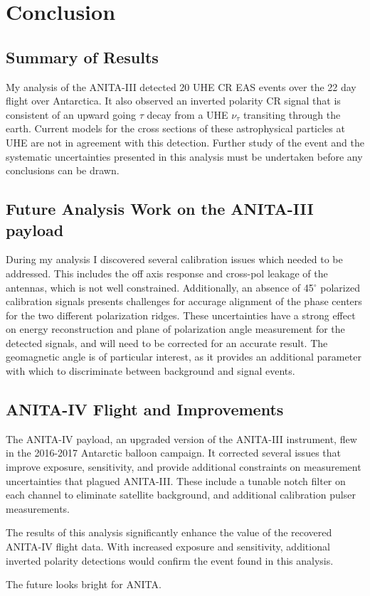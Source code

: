 			
\chapter{Conclusion}

\section{Summary of Results}
	My analysis of the ANITA-III detected 20 UHE CR EAS events over the 22 day flight over Antarctica.  It also observed an inverted polarity CR signal that is consistent of an upward going $\tau$ decay from a UHE $\nu_{\tau}$ transiting through the earth.  Current models for the cross sections of these astrophysical particles at UHE are not in agreement with this detection.  Further study of the event and the systematic uncertainties presented in this analysis must be undertaken before any conclusions can be drawn.


\section{Future Analysis Work on the ANITA-III payload}
	During my analysis I discovered several calibration issues which needed to be addressed.  This includes the off axis response and cross-pol leakage of the antennas, which is not well constrained.  Additionally, an absence of 45$^\circ$ polarized calibration signals presents challenges for accurage alignment of the phase centers for the two different polarization ridges.  These uncertainties have a strong effect on energy reconstruction and plane of polarization angle measurement for the detected signals, and will need to be corrected for an accurate result.  The geomagnetic angle is of particular interest, as it provides an additional parameter with which to discriminate between background and signal events.


\section{ANITA-IV Flight and Improvements}
	The ANITA-IV payload, an upgraded version of the ANITA-III instrument, flew in the 2016-2017 Antarctic balloon campaign.  It corrected several issues that improve exposure, sensitivity, and provide additional constraints on measurement uncertainties that plagued ANITA-III.  These include a tunable notch filter on each channel to eliminate satellite background, and additional calibration pulser measurements.
	
	The results of this analysis significantly enhance the value of the recovered ANITA-IV flight data.  With increased exposure and sensitivity, additional inverted polarity detections would confirm the event found in this analysis.
	
	The future looks bright for ANITA.
	
	
